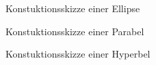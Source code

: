 \begin{figure}[h]
 	\centering
 		\resizebox{0.5\linewidth}{!}{
			
		}
	\caption{Konstuktionsskizze einer Ellipse}
\end{figure}

\begin{figure}[h]
 	\centering
 		\resizebox{0.5\linewidth}{!}{
			
		}
	\caption{Konstuktionsskizze einer Parabel}
\end{figure}

\begin{figure}[h]
 	\centering
 		\resizebox{0.5\linewidth}{!}{
			
		}
	\caption{Konstuktionsskizze einer Hyperbel}
\end{figure}